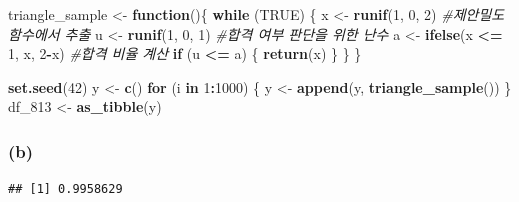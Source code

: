 \documentclass[
]{article}
\newenvironment{Shaded}{\begin{snugshade}}{\end{snugshade}}
\newcommand{\CommentTok}[1]{\textcolor[rgb]{0.56,0.35,0.01}{\textit{#1}}}
\newcommand{\ConstantTok}[1]{\textcolor[rgb]{0.56,0.35,0.01}{#1}}
\newcommand{\ControlFlowTok}[1]{\textcolor[rgb]{0.13,0.29,0.53}{\textbf{#1}}}
\newcommand{\DecValTok}[1]{\textcolor[rgb]{0.00,0.00,0.81}{#1}}
\newcommand{\FunctionTok}[1]{\textcolor[rgb]{0.13,0.29,0.53}{\textbf{#1}}}
\newcommand{\NormalTok}[1]{#1}
\newcommand{\OtherTok}[1]{\textcolor[rgb]{0.56,0.35,0.01}{#1}}
\newcommand{\SpecialCharTok}[1]{\textcolor[rgb]{0.81,0.36,0.00}{\textbf{#1}}}
\begin{document}
\begin{Shaded}
\begin{Highlighting}[]
\NormalTok{triangle\_sample }\OtherTok{\textless{}{-}} \ControlFlowTok{function}\NormalTok{()\{}
  \ControlFlowTok{while}\NormalTok{ (}\ConstantTok{TRUE}\NormalTok{) \{}
\NormalTok{    x }\OtherTok{\textless{}{-}} \FunctionTok{runif}\NormalTok{(}\DecValTok{1}\NormalTok{, }\DecValTok{0}\NormalTok{, }\DecValTok{2}\NormalTok{) }\CommentTok{\#제안밀도함수에서 추출 }
\NormalTok{    u }\OtherTok{\textless{}{-}} \FunctionTok{runif}\NormalTok{(}\DecValTok{1}\NormalTok{, }\DecValTok{0}\NormalTok{, }\DecValTok{1}\NormalTok{) }\CommentTok{\#합격 여부 판단을 위한 난수}
\NormalTok{    a }\OtherTok{\textless{}{-}} \FunctionTok{ifelse}\NormalTok{(x }\SpecialCharTok{\textless{}=} \DecValTok{1}\NormalTok{, x, }\DecValTok{2}\SpecialCharTok{{-}}\NormalTok{x) }\CommentTok{\#합격 비율 계산}
    \ControlFlowTok{if}\NormalTok{ (u }\SpecialCharTok{\textless{}=}\NormalTok{ a) \{}
      \FunctionTok{return}\NormalTok{(x)}
\NormalTok{    \}}
\NormalTok{  \}}
\NormalTok{\}}

\FunctionTok{set.seed}\NormalTok{(}\DecValTok{42}\NormalTok{)}
\NormalTok{y }\OtherTok{\textless{}{-}} \FunctionTok{c}\NormalTok{()}
\ControlFlowTok{for}\NormalTok{ (i }\ControlFlowTok{in} \DecValTok{1}\SpecialCharTok{:}\DecValTok{1000}\NormalTok{) \{}
\NormalTok{  y }\OtherTok{\textless{}{-}} \FunctionTok{append}\NormalTok{(y, }\FunctionTok{triangle\_sample}\NormalTok{())}
\NormalTok{\}}
\NormalTok{df\_813 }\OtherTok{\textless{}{-}} \FunctionTok{as\_tibble}\NormalTok{(y)}
\end{Highlighting}
\end{Shaded}

\subsubsection{(b)}\label{b-2}

\begin{Shaded}
\end{Shaded}

\begin{verbatim}
## [1] 0.9958629
\end{verbatim}

\begin{Shaded}
\end{Shaded}
\end{document}
